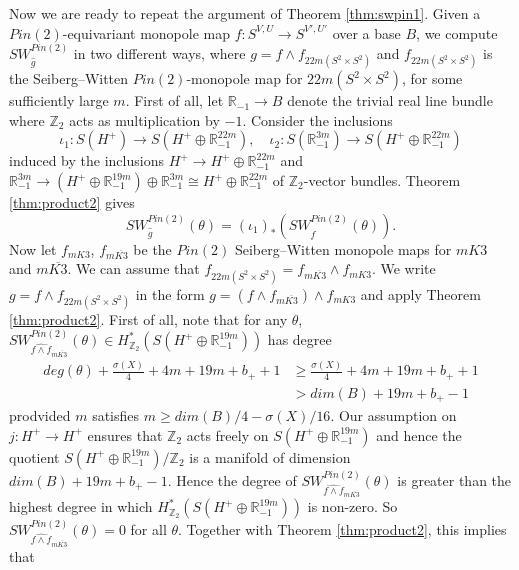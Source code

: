 \documentclass{amsart}
\theoremstyle{definition}
\theoremstyle{remark}
\numberwithin{equation}{section}
\begin{document}
Now we are ready to repeat the argument of Theorem \ref{thm:swpin1}. Given a $Pin(2)$-equivariant monopole map $f : S^{V,U} \to S^{V',U'}$ over a base $B$, we compute $SW^{Pin(2)}_{\widehat{g}}$ in two different ways, where $g =f \wedge f_{22m(S^2 \times S^2)}$ and $f_{22m(S^2 \times S^2)}$ is the Seiberg--Witten $Pin(2)$-monopole map for $22m(S^2 \times S^2)$, for some sufficiently large $m$. First of all, let $\mathbb{R}_{-1} \to B$ denote the trivial real line bundle where $\mathbb{Z}_2$ acts as multiplication by $-1$. Consider the inclusions
\[
\iota_1 : S(H^+) \to S(H^+ \oplus \mathbb{R}^{22m}_{-1}), \quad \iota_2 : S(\mathbb{R}^{3m}_{-1}) \to S(H^+ \oplus \mathbb{R}^{22m}_{-1})
\]
induced by the inclusions $H^+ \to H^+ \oplus \mathbb{R}^{22m}_{-1}$ and $\mathbb{R}^{3m}_{-1} \to (H^+ \oplus \mathbb{R}^{19m}_{-1}) \oplus \mathbb{R}^{3m}_{-1} \cong H^+ \oplus \mathbb{R}^{22m}_{-1}$ of $\mathbb{Z}_2$-vector bundles. Theorem \ref{thm:product2} gives
\begin{equation}\label{equ:ghat1}
SW^{Pin(2)}_{\widehat{g}}(\theta) = (\iota_1)_*( SW^{Pin(2)}_{\widehat{f}}(\theta)).
\end{equation}
Now let $f_{mK3}$, $f_{m\overline{K3}}$ be the $Pin(2)$ Seiberg--Witten monopole maps for $mK3$ and $m\overline{K3}$. We can assume that $f_{22m(S^2 \times S^2)} = f_{m\overline{K3}} \wedge f_{mK3}$. We write $g = f \wedge f_{22m(S^2 \times S^2)}$ in the form $g = (f \wedge f_{m\overline{K3}}) \wedge f_{mK3}$ and apply Theorem \ref{thm:product2}. First of all, note that for any $\theta$, $SW^{Pin(2)}_{\widehat{f \wedge f}_{m\overline{K3}}}(\theta) \in H^*_{\mathbb{Z}_2}( S(H^+ \oplus \mathbb{R}^{19m}_{-1}))$ has degree
\begin{align*}
deg(\theta) + \frac{\sigma(X)}{4} + 4m + 19m + b_+ + 1 & \ge  \frac{\sigma(X)}{4} + 4m + 19m + b_+ + 1 \\
& > dim(B) + 19m + b_+ - 1
\end{align*}
prodvided $m$ satisfies $m \ge dim(B)/4 - \sigma(X)/16$. Our assumption on $j : H^+ \to H^+$ ensures that $\mathbb{Z}_2$ acts freely on $S(H^+ \oplus \mathbb{R}^{19m}_{-1})$ and hence the quotient $S(H^+ \oplus \mathbb{R}^{19m}_{-1})/\mathbb{Z}_2$ is a manifold of dimension $dim(B) + 19m + b_+ - 1$. Hence the degree of $SW^{Pin(2)}_{\widehat{f \wedge f}_{m\overline{K3}}}(\theta)$ is greater than the highest degree in which $H^*_{\mathbb{Z}_2}( S(H^+ \oplus \mathbb{R}^{19m}_{-1}))$ is non-zero. So $SW^{Pin(2)}_{\widehat{f \wedge f}_{m\overline{K3}}}(\theta) = 0$ for all $\theta$. Together with Theorem \ref{thm:product2}, this implies that
\end{document}
